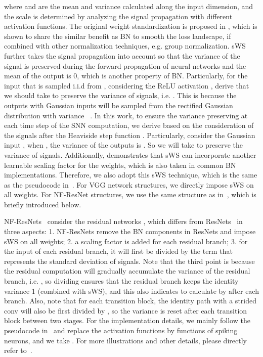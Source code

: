 \documentclass{article}
\begin{document}
where  and  are the mean and variance calculated along the input dimension, and the scale  is determined by analyzing the signal propagation with different activation functions. The original weight standardization is proposed in \cite{qiao2019weight}, which is shown to share the similar benefit as BN to smooth the loss landscape, if combined with other normalization techniques, e.g. group normalization. sWS further takes the signal propagation into account so that the variance of the signal is preserved during the forward propagation of neural networks and the mean of the output is 0, which is another property of BN. Particularly, for the input  that is sampled i.i.d from , considering the ReLU activation , \cite{brock2021characterizing} derive that we should take  to preserve the variance of signals, i.e. . This is because the outputs  with Gaussian inputs will be sampled from the rectified Gaussian distribution with variance ~\cite{brock2021characterizing}. In this work, to ensure the variance preserving at each time step of the SNN computation, we derive  based on the consideration of the signals after the Heaviside step function . Particularly, consider the Gaussian input , when , the variance of the outputs  is . So we will take  to preserve the variance of signals. Additionally, \cite{brock2021characterizing} demonstrates that sWS can incorporate another learnable scaling factor for the weights, which is also taken in common BN implementations. Therefore, we also adopt this sWS technique, which is the same as the pseudocode in~\cite{brock2021characterizing}. For VGG network structures, we directly impose sWS on all weights. For NF-ResNet structures, we use the same structure as in~\cite{brock2021characterizing}, which is briefly introduced below.

NF-ResNets~\cite{brock2021characterizing} consider the residual networks , which differs from ResNets~\cite{he2016identity} in three aspects: 1. NF-ResNets remove the BN components in ResNets and impose sWS on all weights; 2. a scaling factor  is added for each residual branch; 3. for the input of each residual branch, it will first be divided by the term  that represents the standard deviation of signals. Note that the third point is because the residual computation  will gradually accumulate the variance of the residual branch, i.e. , so dividing  ensures that the residual branch keeps the identity variance 1 (combined with sWS), and this also indicates to calculate  by  after each branch. Also, note that for each transition block, the identity path with a strided conv will also be first divided by , so the variance is reset after each transition block between two stages. For the implementation details, we mainly follow the pseudocode in~\cite{brock2021characterizing} and replace the activation functions by functions of spiking neurons, and we take . For more illustrations and other details, please directly refer to~\cite{brock2021characterizing}.
\end{document}
